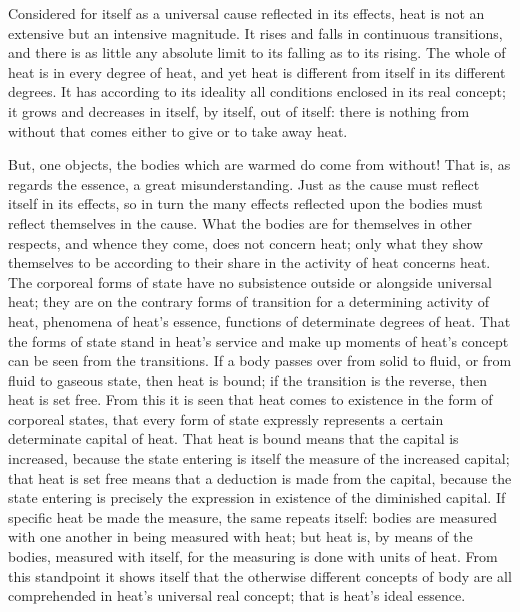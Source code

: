\documentclass[12pt,a4paper]{book}
\begin{document}
Considered for itself as a universal cause reflected in its effects, heat is not an extensive but an intensive magnitude.
It rises and falls in continuous transitions, and there is as little any absolute limit to its falling as to its rising.
The whole of heat is in every degree of heat, and yet heat is different from itself in its different degrees. It has
according to its ideality all conditions enclosed in its real concept; it grows and decreases in itself, by itself, out
of itself: there is nothing from without that comes either to give or to take away heat.

But, one objects, the bodies which are warmed do come from without! That is, as regards the essence, a great
misunderstanding. Just as the cause must reflect itself in its effects, so in turn the many effects reflected upon the
bodies must reflect themselves in the cause. What the bodies are for themselves in other respects, and whence they come,
does not concern heat; only what they show themselves to be according to their share in the activity of heat concerns
heat. The corporeal forms of state have no subsistence outside or alongside universal heat; they are on the contrary
forms of transition for a determining activity of heat, phenomena of heat's essence, functions of determinate degrees of
heat. That the forms of state stand in heat's service and make up moments of heat's concept can be seen from the
transitions. If a body passes over from solid to fluid, or from fluid to gaseous state, then heat is bound; if the
transition is the reverse, then heat is set free. From this it is seen that heat comes to existence in the form of
corporeal states, that every form of state expressly represents a certain determinate capital of heat. That heat is bound
means that the capital is increased, because the state entering is itself the measure of the increased capital; that heat
is set free means that a deduction is made from the capital, because the state entering is precisely the expression in
existence of the diminished capital. If specific heat be made the measure, the same repeats itself: bodies are measured
with one another in being measured with heat; but heat is, by means of the bodies, measured with itself, for the measuring
is done with units of heat. From this standpoint it shows itself that the otherwise different concepts of body are all
comprehended in heat's universal real concept; that is heat's ideal essence.
\end{document}
